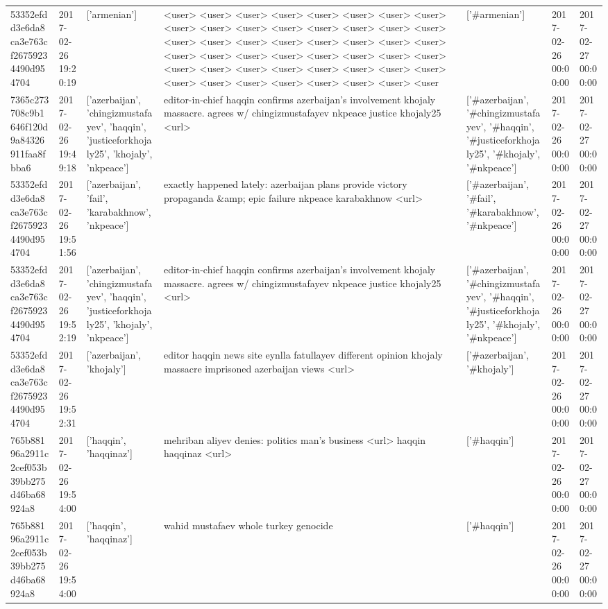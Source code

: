 \begin{tabular}{lllllll}
53352efdd3e6da8ca3e763cf26759234490d954704 & 2017-02-26 19:20:19 & ['armenian'] & <user> <user> <user> <user> <user> <user> <user> <user> <user> <user> <user> <user> <user> <user> <user> <user> <user> <user> <user> <user> <user> <user> <user> <user> <user> <user> <user> <user> <user> <user> <user> <user> <user> <user> <user> <user> <user> <user> <user> <user> <user> <user> <user> <user> <user> <user> <user> <user & ['#armenian'] & 2017-02-26 00:00:00 & 2017-02-27 00:00:00 \\
7365c273708c9b1646f120d9a84326911faa8fbba6 & 2017-02-26 19:49:18 & ['azerbaijan', 'chingizmustafayev', 'haqqin', 'justiceforkhojaly25', 'khojaly', 'nkpeace'] & editor-in-chief haqqin confirms azerbaijan's involvement khojaly massacre. agrees w/ chingizmustafayev nkpeace justice khojaly25 <url> & ['#azerbaijan', '#chingizmustafayev', '#haqqin', '#justiceforkhojaly25', '#khojaly', '#nkpeace'] & 2017-02-26 00:00:00 & 2017-02-27 00:00:00 \\
53352efdd3e6da8ca3e763cf26759234490d954704 & 2017-02-26 19:51:56 & ['azerbaijan', 'fail', 'karabakhnow', 'nkpeace'] & exactly happened lately: azerbaijan plans provide victory propaganda \&amp; epic failure nkpeace karabakhnow <url> & ['#azerbaijan', '#fail', '#karabakhnow', '#nkpeace'] & 2017-02-26 00:00:00 & 2017-02-27 00:00:00 \\
53352efdd3e6da8ca3e763cf26759234490d954704 & 2017-02-26 19:52:19 & ['azerbaijan', 'chingizmustafayev', 'haqqin', 'justiceforkhojaly25', 'khojaly', 'nkpeace'] & editor-in-chief haqqin confirms azerbaijan's involvement khojaly massacre. agrees w/ chingizmustafayev nkpeace justice khojaly25 <url> & ['#azerbaijan', '#chingizmustafayev', '#haqqin', '#justiceforkhojaly25', '#khojaly', '#nkpeace'] & 2017-02-26 00:00:00 & 2017-02-27 00:00:00 \\
53352efdd3e6da8ca3e763cf26759234490d954704 & 2017-02-26 19:52:31 & ['azerbaijan', 'khojaly'] & editor haqqin news site eynlla fatullayev different opinion khojaly massacre imprisoned azerbaijan views <url> & ['#azerbaijan', '#khojaly'] & 2017-02-26 00:00:00 & 2017-02-27 00:00:00 \\
765b88196a2911c2cef053b39bb275d46ba68924a8 & 2017-02-26 19:54:00 & ['haqqin', 'haqqinaz'] & mehriban aliyev denies: politics man's business <url> haqqin haqqinaz <url> & ['#haqqin'] & 2017-02-26 00:00:00 & 2017-02-27 00:00:00 \\
765b88196a2911c2cef053b39bb275d46ba68924a8 & 2017-02-26 19:54:00 & ['haqqin', 'haqqinaz'] & wahid mustafaev whole turkey genocide & ['#haqqin'] & 2017-02-26 00:00:00 & 2017-02-27 00:00:00 \\

\end{tabular}
